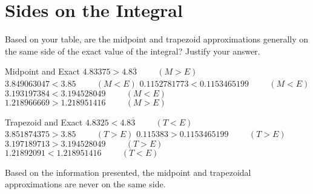 \documentclass[letterpaper,12pt]{article}
\begin{document}
\section{Sides on the Integral}

\raggedright

\begin{large}

 Based on your table, are the midpoint and trapezoid approximations generally on the same side of the exact value of the integral? Justify your answer.

\end{large}

\vspace{1cm}

\begin{minipage}{0.45\textwidth}
 \begin{center}
  Midpoint and Exact
  \vskip 16pt
  \mbox{$4.83375>4.8\overline{3}\hspace{1cm}(M>E)$}
  \vskip 16pt
  \mbox{$3.849063047<3.85\hspace{1cm}(M<E)$}
  \vskip 16pt
  \mbox{$0.1152781773<0.1153465199\hspace{1cm}(M<E)$}
  \vskip 16pt
  \mbox{$3.193197384<3.194528049\hspace{1cm}(M<E)$}
  \vskip 16pt
  \mbox{$1.218966669>1.218951416\hspace{1cm}(M>E)$}
 \end{center}
\end{minipage}
\hfill
\begin{minipage}{0.45\textwidth}
 \begin{center}
  Trapezoid and Exact
  \vskip 16pt
  $4.8325<4.8\overline{3}\hspace{1cm}(T<E)$
  \vskip 16pt
  $3.851874375>3.85\hspace{1cm}(T>E)$
  \vskip 16pt
  $0.115383>0.1153465199\hspace{1cm}(T>E)$
  \vskip 16pt
  $3.197189713>3.194528049\hspace{1cm}(T>E)$
  \vskip 16pt
  $1.21892091<1.218951416\hspace{1cm}(T<E)$
 \end{center}
\end{minipage}

\vspace{1cm}

Based on the information presented, the midpoint and trapezoidal approximations are never on the same side.

\newpage
\end{document}
